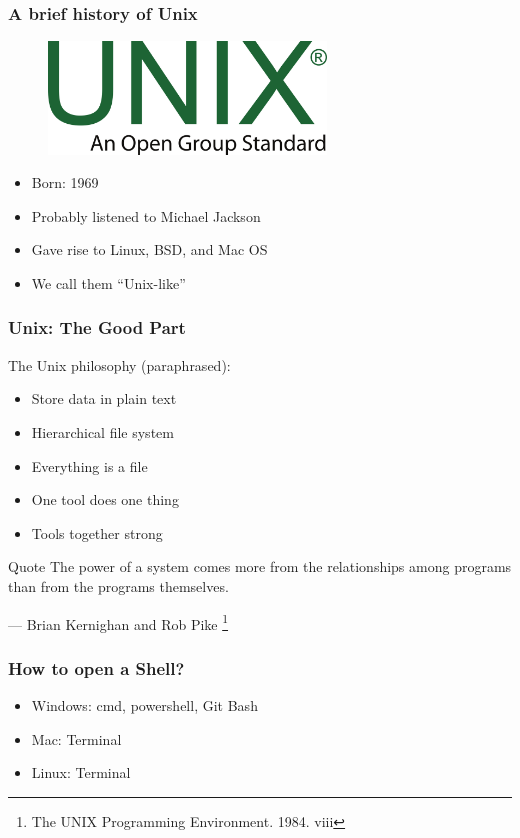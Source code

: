 \documentclass[aspectratio=169]{beamer}
\begin{document}
\begin{frame}
  \frametitle{A brief history of Unix}
  \begin{figure}[h]
    \centering
    \includegraphics[height=3cm]{./assets/unix_logo.png}
  \end{figure}
  \begin{itemize}
    \item Born: 1969
    \item Probably listened to Michael Jackson
    \item Gave rise to Linux, BSD, and Mac OS
    \item We call them ``Unix-like''
  \end{itemize}
\end{frame}

\begin{frame}
  \frametitle{Unix: The Good Part}
  The Unix philosophy (paraphrased):
  \begin{itemize}
    \item Store data in plain text
    \item Hierarchical file system
    \item Everything is a file
    \item One tool does one thing
    \item Tools together strong
  \end{itemize}
  \begin{block}{Quote}
    The power of a system comes more from the relationships among programs than
    from the programs themselves.
    \begin{flushright}
      — Brian Kernighan and Rob Pike
      \footnote{The UNIX Programming Environment. 1984. viii}
    \end{flushright}
  \end{block}
\end{frame}

\begin{frame}
  \frametitle{How to open a Shell?}
  \begin{itemize}
    \item Windows: cmd, powershell, Git Bash
    \item Mac: Terminal
    \item Linux: Terminal
  \end{itemize}
\end{frame}
\end{document}
